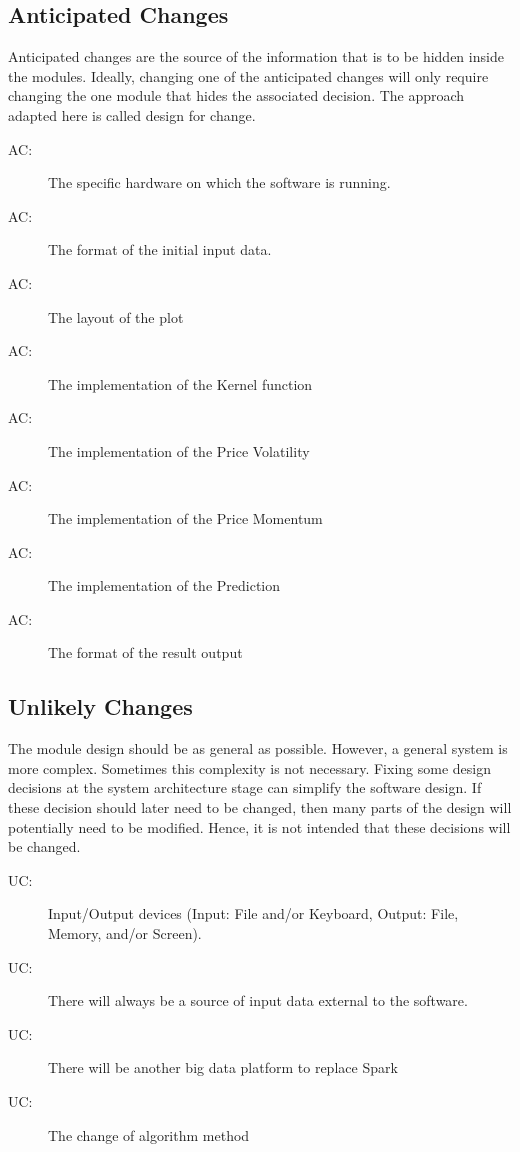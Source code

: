 \documentclass[12pt, titlepage]{article}
\newcounter{acnum}
\newcommand{\actheacnum}{AC\theacnum}
\newcounter{ucnum}
\newcommand{\uctheucnum}{UC\theucnum}
\begin{document}
\subsection{Anticipated Changes} \label{SecAchange}

Anticipated changes are the source of the information that is to be hidden
inside the modules. Ideally, changing one of the anticipated changes will only
require changing the one module that hides the associated decision. The approach
adapted here is called design for
change.

\begin{description}
\item[ \actheacnum \label{AC1}:] The specific
hardware on which the software is running.
\item[ \actheacnum \label{AC2}:] The format of the
initial input data.
\item[ \actheacnum \label{AC3}:] The layout of the plot
\item[ \actheacnum \label{AC4}:] The implementation of the Kernel function
\item[ \actheacnum \label{AC5}:] The implementation of the Price Volatility
\item[ \actheacnum \label{AC6}:] The implementation of the Price Momentum
\item[ \actheacnum \label{AC7}:] The implementation of the Prediction
\item[ \actheacnum \label{AC8}:] The format of the result output 
\end{description}

\subsection{Unlikely Changes} \label{SecUchange}

The module design should be as general as possible. However, a general system is
more complex. Sometimes this complexity is not necessary. Fixing some design
decisions at the system architecture stage can simplify the software design. If
these decision should later need to be changed, then many parts of the design
will potentially need to be modified. Hence, it is not intended that these
decisions will be changed.

\begin{description}
\item[ \uctheucnum \label{UC1}:] Input/Output devices
(Input: File and/or Keyboard, Output: File, Memory, and/or Screen).
\item[ \uctheucnum \label{UC2}:] There will always be
a source of input data external to the software.
\item[ \uctheucnum \label{UC3}:] There will be another big data platform to replace Spark
\item[ \uctheucnum \label{UC4}:] The change of algorithm method
\end{description}
\end{document}
